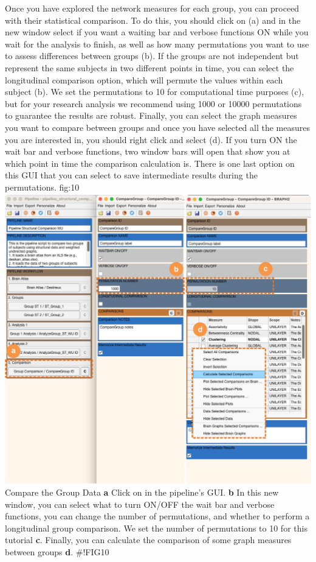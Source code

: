 \documentclass[justified]{tufte-handout}
\begin{document}
Once you have explored the network measures for each group, you can proceed with their statistical comparison. To do this, you should click on  (a) and in the new window select if you want a waiting bar and verbose functions ON while you wait for the analysis to finish, as well as how many permutations you want to use to assess differences between groups ({b}). If the groups are not independent but represent the same subjects in two different points in time, you can select the longitudinal comparison option, which will permute the values within each subject ({b}). We set the permutations to 10 for computational time purposes ({c}), but for your research analysis we recommend using 1000 or 10000 permutations to guarantee the results are robust. Finally, you can select the graph measures you want to compare between groups and once you have selected all the measures you are interested in, you should right click and select  ({d}). If you turn ON the wait bar and verbose functions, two window bars will open that show you at which point in time the comparison calculation is. There is one last option on this GUI that you can select to save intermediate results during the permutations.
{fig:10}
{\includegraphics{fig10.jpg}
}
{Compare the Group Data}
{
	{\bf a} Click on  in the pipeline's GUI.
	{\bf b} In this new window, you can select what to turn ON/OFF the wait bar and verbose functions, you can change the number of permutations, and whether to perform a longitudinal group comparison. We set the number of permutations to 10 for this tutorial {\bf c}. Finally, you can calculate the comparison of some graph measures between groups {\bf d}.
}
#!FIG10
 
\end{document}
